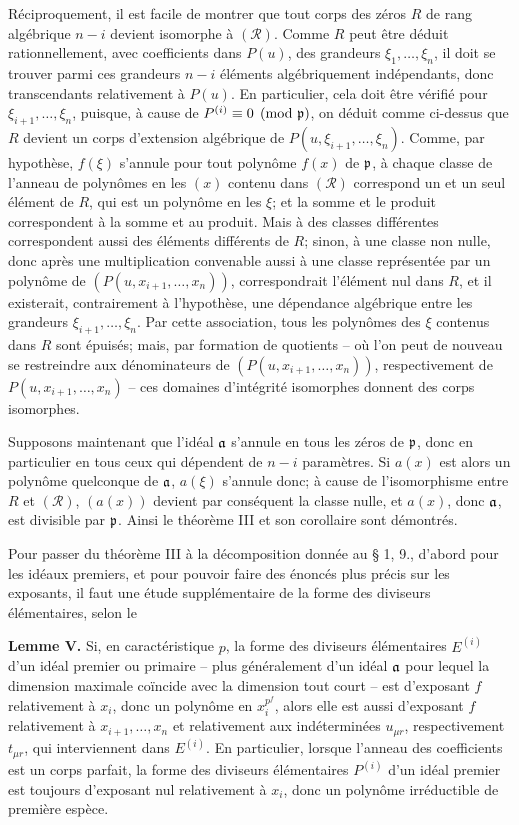 Réciproquement, il est facile de montrer que tout corps des zéros $R$ de rang algébrique $n-i$ devient isomorphe à $(\mathcal R)$. Comme $R$ peut être déduit rationnellement, avec coefficients dans $P(u)$, des grandeurs $\xi_1,\ldots,\xi_n$, il doit se trouver parmi ces grandeurs $n-i$ éléments algébriquement indépendants, donc transcendants relativement à $P(u)$. En particulier, cela doit être vérifié pour $\xi_{i+1},\ldots,\xi_n$, puisque, à cause de $P^{(i)}\equiv0\pmod{\mathfrak p}$, on déduit comme ci-dessus que $R$ devient un corps d'extension algébrique de $P(u,\xi_{i+1},\ldots,\xi_n)$. Comme, par hypothèse, $f(\xi)$ s'annule pour tout polynôme $f(x)$ de $\mathfrak p$, à chaque classe de l'anneau de polynômes en les $(x)$ contenu dans $(\mathcal R)$ correspond un et un seul élément de $R$, qui est un polynôme en les $\xi$; et la somme et le produit correspondent à la somme et au produit. Mais à des classes différentes correspondent aussi des éléments différents de $R$; sinon, à une classe non nulle, donc après une multiplication convenable aussi à une classe représentée par un polynôme de $(P(u,x_{i+1},\ldots,x_n))$, correspondrait l'élément nul dans $R$, et il existerait, contrairement à l'hypothèse, une dépendance algébrique entre les grandeurs $\xi_{i+1},\ldots,\xi_n$. Par cette association, tous les polynômes des $\xi$ contenus dans $R$ sont épuisés; mais, par formation de quotients -- où l'on peut de nouveau se restreindre aux dénominateurs de $(P(u,x_{i+1},\ldots,x_n))$, respectivement de $P(u,x_{i+1},\ldots,x_n)$ -- ces domaines d'intégrité isomorphes donnent des corps isomorphes.

Supposons maintenant que l'idéal $\mathfrak a$ s'annule en tous les zéros de $\mathfrak p$, donc en particulier en tous ceux qui dépendent de $n-i$ paramètres. Si $a(x)$ est alors un polynôme quelconque de $\mathfrak a$, $a(\xi)$ s'annule donc; à cause de l'isomorphisme entre $R$ et $(\mathcal R)$, $(a(x))$ devient par conséquent la classe nulle, et $a(x)$, donc $\mathfrak a$, est divisible par $\mathfrak p$. Ainsi le théorème III et son corollaire sont démontrés.

Pour passer du théorème III à la décomposition donnée au \S{} 1, 9., d'abord pour les idéaux premiers, et pour pouvoir faire des énoncés plus précis sur les exposants, il faut une étude supplémentaire de la forme des diviseurs élémentaires, selon le

\textbf{Lemme V.} Si, en caractéristique $p$, la forme des diviseurs élémentaires $E^{(i)}$ d'un idéal premier ou primaire -- plus généralement d'un idéal $\mathfrak a$ pour lequel la dimension maximale coïncide avec la dimension tout court -- est d'exposant $f$ relativement à $x_i$, donc un polynôme en $x_i^{p^f}$, alors elle est aussi d'exposant $f$ relativement à $x_{i+1},\ldots,x_n$ et relativement aux indéterminées $u_{\mu r}$, respectivement $t_{\mu r}$, qui interviennent dans $E^{(i)}$. En particulier, lorsque l'anneau des coefficients est un corps parfait, la forme des diviseurs élémentaires $P^{(i)}$ d'un idéal premier est toujours d'exposant nul relativement à $x_i$, donc un polynôme irréductible de première espèce.

